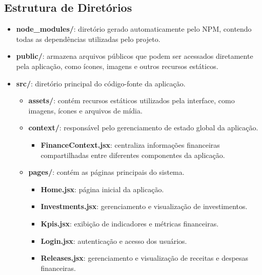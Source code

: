 \documentclass{article}
\begin{document}
\subsection{Estrutura de Diretórios}

\begin{itemize}
    \item \textbf{node\_modules/}: diretório gerado automaticamente pelo NPM, contendo todas as dependências utilizadas pelo projeto.

    \item \textbf{public/}: armazena arquivos públicos que podem ser acessados diretamente pela aplicação, como ícones, imagens e outros recursos estáticos.

    \item \textbf{src/}: diretório principal do código-fonte da aplicação.
    
    \begin{itemize}
        \item \textbf{assets/}: contém recursos estáticos utilizados pela interface, como imagens, ícones e arquivos de mídia.
        
        \item \textbf{context/}: responsável pelo gerenciamento de estado global da aplicação.
        
        \begin{itemize}
            \item \textbf{FinanceContext.jsx}: centraliza informações financeiras compartilhadas entre diferentes componentes da aplicação.
        \end{itemize}
        
        \item \textbf{pages/}: contém as páginas principais do sistema.
        
        \begin{itemize}
            \item \textbf{Home.jsx}: página inicial da aplicação.
            \item \textbf{Investments.jsx}: gerenciamento e visualização de investimentos.
            \item \textbf{Kpis.jsx}: exibição de indicadores e métricas financeiras.
            \item \textbf{Login.jsx}: autenticação e acesso dos usuários.
            \item \textbf{Releases.jsx}: gerenciamento e visualização de receitas e despesas financeiras.
        \end{itemize}
        

\end{itemize}
\end{itemize}
\end{document}
